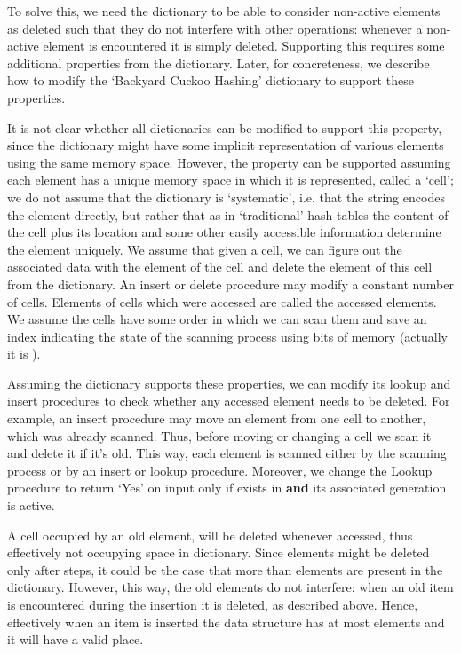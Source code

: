 \documentclass[11pt]{article}
\begin{document}
To solve this, we need the dictionary to be able to consider non-active elements as deleted such that they do not interfere with other operations: whenever a non-active element is encountered it is simply deleted. Supporting this requires some additional properties from the dictionary. Later, for concreteness, we describe how to modify the `Backyard Cuckoo Hashing' dictionary to support these properties.

It is not clear whether all dictionaries can be modified to support this property, since the dictionary might have some implicit representation of various elements using the same memory space. However, the property can be supported assuming each element has a unique memory space in which it is  represented, called a `cell'; we do not assume that the dictionary is `systematic', i.e. that the string encodes the element directly, but rather that as in `traditional' hash tables the content of the cell plus its location and some other easily accessible information determine the element uniquely. We assume that given a cell, we can figure out the associated data with the element of the cell and delete the element of this cell from the dictionary. An insert or delete procedure may modify a constant number of cells. Elements of cells which were accessed are called the accessed elements. We assume the cells have some order in which we can scan them and save an index indicating the state of the scanning process using  bits of memory (actually it is ).

Assuming the dictionary supports these properties, we can modify its lookup and insert procedures to check whether any accessed element needs to be deleted. For example, an insert procedure may move an element from one cell to another, which was already scanned. Thus, before moving or changing a cell we scan it and delete it if it's old. This way, each element is scanned either by the scanning process or by an insert or lookup procedure. Moreover, we change the Lookup procedure to return `Yes' on input  only if  exists in  \textbf{and} its associated generation is active.

A cell occupied by an old element, will be deleted whenever accessed, thus effectively not occupying space in dictionary. Since elements might be deleted only after  steps, it could be the case that more than  elements are present in the dictionary. However, this way, the old elements do not interfere: when an old item is encountered during the insertion it is deleted, as described above. Hence, effectively when an item is inserted the data structure has at most  elements and it will have a valid place.
\end{document}
